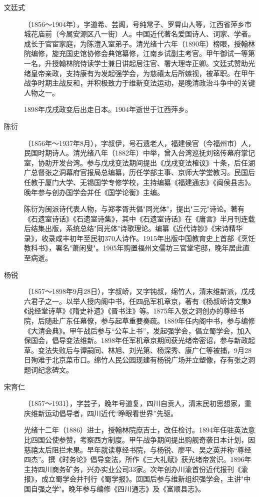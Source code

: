 \begin{description}
  \item[文廷式] （1856～1904年），字道希、芸阁，号纯常子、罗霄山人等，江西省萍乡市城花庙前（今属安源区八一街）人。中国近代著名爱国诗人、词家、学者。成长于官宦家庭，为陈澧入室弟子。清光绪十六年（1890年）榜眼，授翰林院编修，旋充国史馆协修会典馆纂修，江南乡试副主考官。甲午御试一等第一名，升授翰林院侍读学士兼日讲起居注官、署大理寺正卿。文廷式赞助光绪皇帝亲政，支持康有为发起强学会，为慈禧太后所嫉视，被革职。在甲午战争时期主战反和，并积极致力于维新变法运动，是晚清政治斗争中的关键人物之一。\par
        1898年戊戌政变后出走日本。1904年逝世于江西萍乡。
  \item[陈衍] （1856年～1937年8月），字叔伊，号石遗老人，福建侯官（今福州市）人，民国时期诗人。清光绪八年（1882年）中举，曾入台湾巡抚刘铭传幕府掌记室，协助开发台湾。参与戊戌变法期间提出《戊戌变法榷议》十条，后任湖广总督张之洞幕府官报局总编纂，历任学部主事、京师大学堂教习。民国后任教于厦门大学、无锡国学专修学校，主持编纂《福建通志》《闽侯县志》。晚年参与创办国学会并任《国学论衡》主编。\par
        陈衍为闽派诗代表人物，与郑孝胥共倡"同光体"，提出"三元"诗论。著有《石遗室诗话》《石遗室诗集》，其中《石遗室诗话》在《庸言》半月刊连载后结集出版，系统总结"同光体"诗歌理论。编纂《近代诗钞》《宋诗精华录》，收录咸丰初年至民初370人诗作。1915年出版中国教育史上首部《烹饪教科书》，署名"萧闲叟"。1905年购置福州文儒坊三官堂宅邸，晚年居此直至病逝。
  \item[杨锐] （1857～1898年9月28日），字叔峤，又字钝叔，绵竹人，清末维新派，戊戌六君子之一。以举人授内阁中书，任四品军机章京，著有《杨叔峤诗文集》《说经堂诗草》《隋史补遗》《晋书注》等。1875年入张之洞创办的尊经书院，后随赴广东任幕僚，参与起草重要奏疏。1889年任内阁中书，参与编修《大清会典》。甲午战后参与“公车上书”，发起强学会，倡立蜀学会，加入保国会，倡导变法维新。1898年任军机章京期间获光绪帝密诏，参与新政起草。变法失败后与谭嗣同、林旭、刘光第、杨深秀、康广仁等被捕，9月28日殉难于北京菜市口。绵竹人民公园现建有杨锐广场并立塑像，存有张之洞题词纪念碑文。
  \item[宋育仁] （1857～1931），字芸子，晚年号道复，四川自贡人，清末民初思想家，重庆维新运动倡导者，四川近代“睁眼看世界”先驱。\par
        光绪十二年（1886）进士，授翰林院庶吉士，改任检讨。1894年任驻英法意比四国公使参赞，考察西方制度。甲午战争期间提出购舰奇袭日本计划，因慈禧太后阻拦未果。早年就读尊经书院，与杨锐、廖平、吴之英并称“尊经四杰”。撰《时务论》倡导变法，所作《三大礼赋》获光绪帝赏识。1896年主持四川商务矿务，兴办实业公司33家。次年创办川渝首份近代报刊《渝报》，成立蜀学会并刊行《蜀学报》。回国后参与维新组织强学会，主讲"中国自强之学"。晚年参与编修《四川通志》及《富顺县志》。\par

\end{description}
